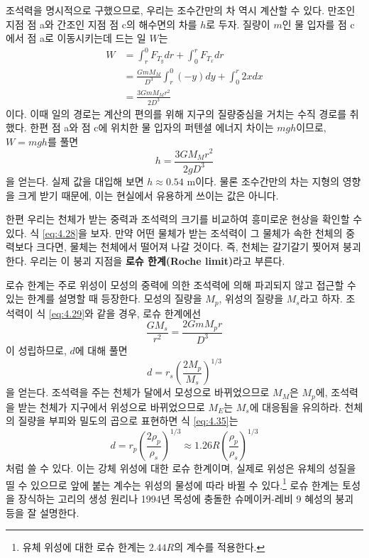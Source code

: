 \documentclass[chapter, oneside, b5paper]{oblivoir}
\theoremstyle{plain}
\theoremstyle{definition}
\theoremstyle{remark}
\begin{document}
조석력을 명시적으로 구했으므로, 우리는 조수간만의 차 역시 계산할 수 있다. 만조인 지점 점 a와 간조인 지점 점 c의 해수면의 차를 $h$로 두자. 질량이 $m$인 물 입자를 점 c에서 점 a로 이동시키는데 드는 일 $W$는
\begin{equation}
    \begin{aligned}
        W &= \int_r^0 F_{T_y } dr +  \int_0^r F_{T_x } dr \\
        &= \frac{GmM_M}{D^3} \int_r^0 (-y) dy +  \int_0^r 2x dx \\
        &= \frac{3GmM_Mr^2}{2D^3}
    \end{aligned}
\end{equation}
이다. 이때 일의 경로는 계산의 편의를 위해 지구의 질량중심을 거치는 수직 경로를 취했다. 한편 점 a와 점 c에 위치한 물 입자의 퍼텐셜 에너지 차이는 $mgh$이므로, $W=mgh$를 풀면
\begin{equation}
    h = \frac{3GM_Mr^2}{2gD^3}
\end{equation}
을 얻는다. 실제 값을 대입해 보면 $h \approx 0.54$
m이다. 물론 조수간만의 차는 지형의 영향을 크게 받기 때문에, 이는 현실에서 유용하게 쓰이는 값은 아니다.

한편 우리는 천체가 받는 중력과 조석력의 크기를 비교하여 흥미로운 현상을 확인할 수 있다. 식 \ref{eq:4.28}을 보자. 만약 어떤 물체가 받는 조석력이 그 물체가 속한 천체의 중력보다 크다면, 물체는 천체에서 떨어져 나갈 것이다. 즉, 천체는 갈기갈기 찢어져 붕괴한다. 우리는 이 붕괴 지점을 \textbf{로슈 한계(Roche limit)}라고 부른다.

로슈 한계는 주로 위성이 모성의 중력에 의한 조석력에 의해 파괴되지 않고 접근할 수 있는 한계를 설명할 때 등장한다. 모성의 질량을 $M_p$, 위성의 질량을 $M_s$라고 하자. 조석력이 식 \ref{eq:4.29}와 같을 경우, 로슈 한계에선
\begin{equation}
    \frac{GM_s}{r^2} = \frac{2GmM_pr}{D^3}
\end{equation}
이 성립하므로, $d$에 대해 풀면
\begin{equation}
    d = r_s \left( \frac{2M_p}{M_s} \right)^{1/3}
    \label{eq:4.35}
\end{equation}
을 얻는다. 조석력을 주는 천체가 달에서 모성으로 바뀌었으므로 $M_M$은 $M_p$에, 조석력을 받는 천체가 지구에서 위성으로 바뀌었으므로 $M_E$는 $M_s$에 대응됨을 유의하라. 천체의 질량을 부피와 밀도의 곱으로 표현하면 식 \ref{eq:4.35}는
\begin{equation}
    d = r_p \left( \frac{2 \rho_p}{\rho_s} \right)^{1/3} \approx 1.26R\left( \frac{\rho_p}{\rho_s} \right)^{1/3}
\end{equation}
처럼 쓸 수 있다. 이는 강체 위성에 대한 로슈 한계이며, 실제로 위성은 유체의 성질을 띨 수 있으므로 앞에 붙는 계수는 위성의 물성에 따라 바뀔 수 있다.\footnote{유체 위성에 대한 로슈 한계는 $2.44R$의 계수를 적용한다.} 로슈 한계는 토성을 장식하는 고리의 생성 원리나 1994년 목성에 충돌한 슈메이커-레비 9 혜성의 붕괴 등을 잘 설명한다.
\end{document}
